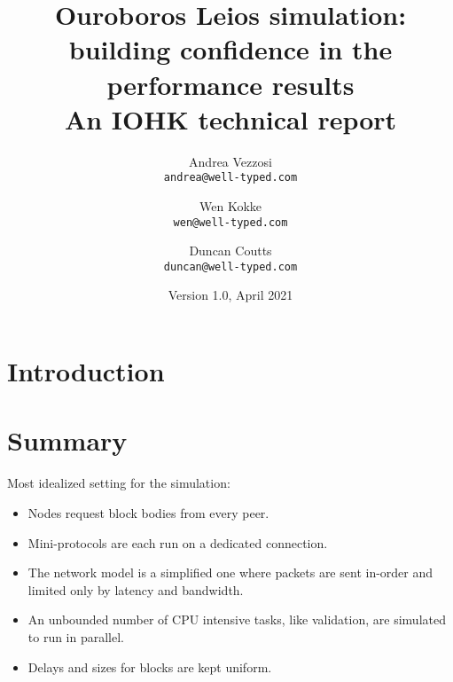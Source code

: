 \documentclass[11pt,a4paper]{article}
\begin{document}
\title{Ouroboros Leios simulation: \\
       building confidence in the performance results \\
       {\large \sc An IOHK technical report}
  }
\date{Version 1.0, April 2021}
\author{Andrea Vezzosi     \\ {\small \texttt{andrea@well-typed.com}} \\
   \and Wen Kokke          \\ {\small \texttt{wen@well-typed.com}} \\
   \and Duncan Coutts      \\ {\small \texttt{duncan@well-typed.com}}
   }

\maketitle

\section{Introduction}
\label{introduction}


\tableofcontents

\listoftodos

\section{Summary}
\label{summary}

Most idealized setting for the simulation:
\begin{itemize}
\item Nodes request block bodies from every peer.
\item Mini-protocols are each run on a dedicated connection.
\item The network model is a simplified one where packets are sent in-order and
  limited only by latency and bandwidth.
\item An unbounded number of CPU intensive tasks, like validation, are simulated to run in parallel.
\item Delays and sizes for blocks are kept uniform.
\end{itemize}
\end{document}
